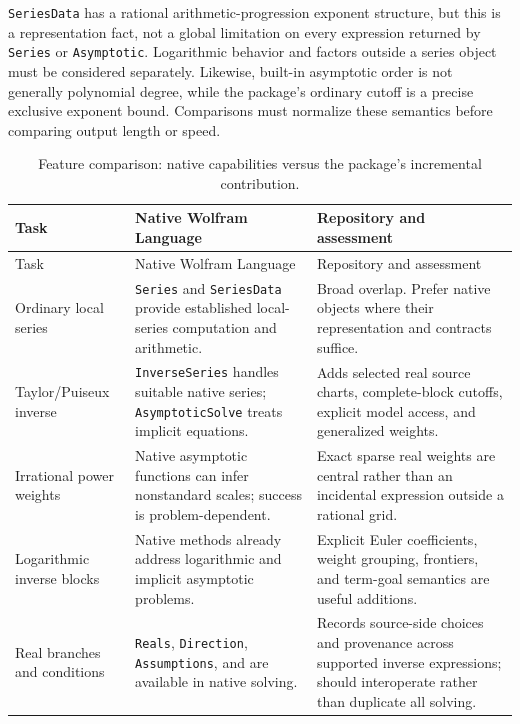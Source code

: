 \texttt{SeriesData} has a rational arithmetic-progression exponent structure, but this is a representation fact, not a global limitation on every expression returned by \texttt{Series} or \texttt{Asymptotic}. Logarithmic behavior and factors outside a series object must be considered separately. Likewise, built-in asymptotic order is not generally polynomial degree, while the package's ordinary cutoff is a precise exclusive exponent bound. Comparisons must normalize these semantics before comparing output length or speed.\cite{wl-seriesdata,wl-series,wl-asymptotic,wl-asymptoticsolve}

\begin{longtable}{@{}P{3.0cm}P{5.9cm}P{6.0cm}@{}}
\caption{Feature comparison: native capabilities versus the package's incremental contribution.}\label{tab:features}\\
\toprule Task & Native Wolfram Language & Repository and assessment \\\midrule
\endfirsthead
\toprule Task & Native Wolfram Language & Repository and assessment \\\midrule
\endhead
Ordinary local series & \texttt{Series} and \texttt{SeriesData} provide established local-series computation and arithmetic. & Broad overlap. Prefer native objects where their representation and contracts suffice.\cite{wl-series,wl-seriesdata}\\
Taylor/Puiseux inverse & \texttt{InverseSeries} handles suitable native series; \texttt{AsymptoticSolve} treats implicit equations. & Adds selected real source charts, complete-block cutoffs, explicit model access, and generalized weights.\cite{wl-inverseseries,wl-asymptoticsolve,core}\\
Irrational power weights & Native asymptotic functions can infer nonstandard scales; success is problem-dependent. & Exact sparse real weights are central rather than an incidental expression outside a rational grid.\cite{wl-asymptotic,core}\\
Logarithmic inverse blocks & Native methods already address logarithmic and implicit asymptotic problems. & Explicit Euler coefficients, weight grouping, frontiers, and term-goal semantics are useful additions.\cite{wl-asymptoticsolve,core}\\
Real branches and conditions & \texttt{Reals}, \texttt{Direction}, \texttt{Assumptions}, and  are available in native solving. & Records source-side choices and provenance across supported inverse expressions; should interoperate rather than duplicate all solving.\cite{wl-asymptoticsolve,inverseexpressions}\\

\end{longtable}
